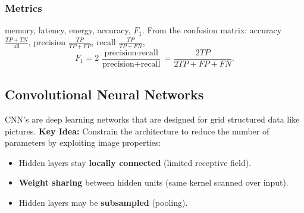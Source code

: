 \subsubsection{Metrics} 
memory, latency, energy, accuracy, $F_1$. From the confusion matrix: accuracy $\frac{TP+TN}{\text{all}}$, precision $\frac{TP}{TP+FP}$, recall $\frac{TP}{TP+FN}$,
\[ F_1 = 2\,\frac{\text{precision}\cdot\text{recall}}{\text{precision}+\text{recall}} = \frac{2TP}{2TP+FP+FN}. \]




\subsection{Convolutional Neural Networks}
CNN's are deep learning networks that are designed for grid structured data like pictures.
\textbf{Key Idea:} Constrain the architecture to reduce the number of parameters by exploiting image properties:
\begin{itemize}
  \item Hidden layers stay \textbf{locally connected} (limited receptive field).
  \item \textbf{Weight sharing} between hidden units (same kernel scanned over input).
  \item Hidden layers may be \textbf{subsampled} (pooling).
\end{itemize}
